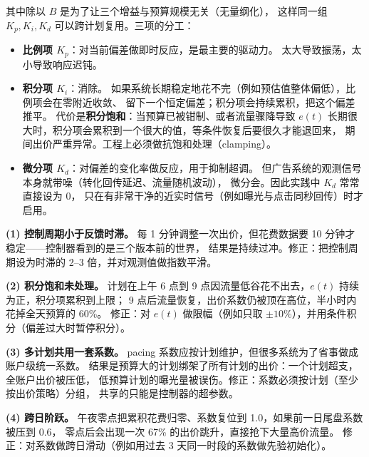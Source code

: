 其中除以 $B$ 是为了让三个增益与预算规模无关（无量纲化），
这样同一组 $K_p, K_i, K_d$ 可以跨计划复用。三项的分工：

\begin{itemize}
  \item \textbf{比例项 $K_p$}：对当前偏差做即时反应，是最主要的驱动力。
        太大导致振荡，太小导致响应迟钝。
  \item \textbf{积分项 $K_i$}：消除。
        如果系统长期稳定地花不完（例如预估值整体偏低），比例项会在零附近收敛、
        留下一个恒定偏差；积分项会持续累积，把这个偏差推平。
        代价是\textbf{积分饱和}：当预算已被钳制、或者流量骤降导致
        $e(t)$ 长期很大时，积分项会累积到一个很大的值，等条件恢复后要很久才能退回来，
        期间出价严重异常。工程上必须做抗饱和处理（clamping）。
  \item \textbf{微分项 $K_d$}：对偏差的变化率做反应，用于抑制超调。
        但广告系统的观测信号本身就带噪（转化回传延迟、流量随机波动），
        微分会。因此实践中 $K_d$ 常常直接设为 0，
        只在有非常干净的近实时信号（例如曝光与点击同秒回传）时才启用。
\end{itemize}

\begin{pitfall}
\textbf{(1) 控制周期小于反馈时滞。}
每 1 分钟调整一次出价，但花费数据要 10 分钟才稳定——控制器看到的是三个版本前的世界，
结果是持续过冲。修正：把控制周期设为时滞的 2--3 倍，并对观测值做指数平滑。

\textbf{(2) 积分饱和未处理。}
计划在上午 6 点到 9 点因流量低谷花不出去，$e(t)$ 持续为正，积分项累积到上限；
9 点后流量恢复，出价系数仍被顶在高位，半小时内花掉全天预算的 60\%。
修正：对 $e(t)$ 做限幅（例如只取 $\pm 10\%$），并用条件积分（偏差过大时暂停积分）。

\textbf{(3) 多计划共用一套系数。}
pacing 系数应按计划维护，但很多系统为了省事做成账户级统一系数。
结果是预算大的计划绑架了所有计划的出价：一个计划超支，全账户出价被压低，
低预算计划的曝光量被误伤。修正：系数必须按计划（至少按出价策略）分组，
共享的只能是控制器的超参数。

\textbf{(4) 跨日阶跃。}
午夜零点把累积花费归零、系数复位到 1.0，如果前一日尾盘系数被压到 0.6，
零点后会出现一次 67\% 的出价跳升，直接抢下大量高价流量。
修正：对系数做跨日滑动（例如用过去 3 天同一时段的系数做先验初始化）。
\end{pitfall}

